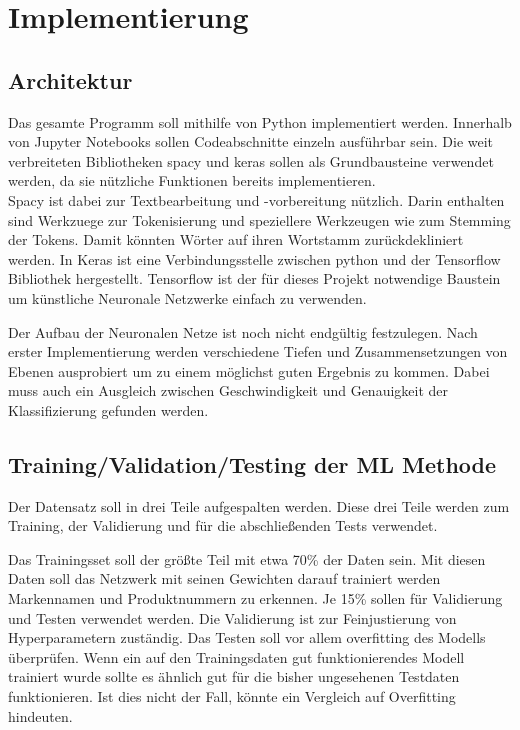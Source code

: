 \documentclass[paper=a4,12pt,listof=totoc]{scrartcl}%
\begin{document}
	\section{Implementierung}
	\subsection{Architektur} %
	Das gesamte Programm soll mithilfe von Python implementiert werden. Innerhalb von Jupyter Notebooks sollen Codeabschnitte einzeln ausführbar sein. Die weit verbreiteten Bibliotheken spacy und keras sollen als Grundbausteine verwendet werden, da sie nützliche Funktionen bereits implementieren.\\
	Spacy ist dabei zur Textbearbeitung und -vorbereitung nützlich. Darin enthalten sind Werkzuege zur Tokenisierung und speziellere Werkzeugen wie zum Stemming der Tokens. Damit könnten Wörter auf ihren Wortstamm zurückdekliniert werden.
	In Keras ist eine Verbindungsstelle zwischen python und der Tensorflow Bibliothek hergestellt. Tensorflow ist der für dieses Projekt notwendige Baustein um künstliche Neuronale Netzwerke einfach zu verwenden.
	
	Der Aufbau der Neuronalen Netze ist noch nicht endgültig festzulegen. Nach erster Implementierung werden verschiedene Tiefen und Zusammensetzungen von Ebenen ausprobiert um zu einem möglichst guten Ergebnis zu kommen. Dabei muss auch ein Ausgleich zwischen Geschwindigkeit und Genauigkeit der Klassifizierung gefunden werden.
	
	\subsection{Training/Validation/Testing der ML Methode} %
	Der Datensatz soll in drei Teile aufgespalten werden. Diese drei Teile werden zum Training, der Validierung und für die abschließenden Tests verwendet. 
	
	Das Trainingsset soll der größte Teil mit etwa 70\% der Daten sein. Mit diesen Daten soll das Netzwerk mit seinen Gewichten darauf trainiert werden Markennamen und Produktnummern zu erkennen.
	Je 15\% sollen für Validierung und Testen verwendet werden.
	Die Validierung ist zur Feinjustierung von Hyperparametern zuständig.
	Das Testen soll vor allem overfitting des Modells überprüfen. Wenn ein auf den Trainingsdaten gut funktionierendes Modell trainiert wurde sollte es ähnlich gut für die bisher ungesehenen Testdaten funktionieren. Ist dies nicht der Fall, könnte ein Vergleich auf Overfitting hindeuten.
	
\end{document}
